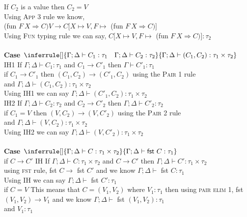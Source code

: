 \documentclass{article}
\begin{document}
If $C_2$ is a value then $C_2 = V$ \\
Using \textsc{App 3} rule we know,\\
(fun $F \ X \Rightarrow C) V \to C[X \mapsto V, F \mapsto$ (fun $F \ X \Rightarrow C)]$ \\
Using \textsc{Fun} typing rule we can say, $C[X \mapsto V, F \mapsto$ (fun $F \ X \Rightarrow C)] : \tau_2$
\\\\
\textbf{Case $\inferrule []
{ \Gamma ; \Delta \vdash C_1 : \tau_1 \quad \Gamma ; \Delta \vdash C_2 : \tau_2 }
{ \Gamma ; \Delta \vdash (C_1, C_2) : \tau_1 \times \tau_2  }$ } \\
IH1 If $\Gamma;\Delta \vdash C_1 : \tau_1$ and  $C_1 \to C'_1$ then $\Gamma \vdash C'_1 : \tau_1$ \\
if $C_1 \to C'_1$ then $(C_1,C_2) \to (C'_1, C_2)$ using the \textsc{Pair 1} rule\\
and $\Gamma;\Delta \vdash (C_1, C_2) : \tau_1 \times \tau_2$ \\
Using IH1 we can say $\Gamma;\Delta \vdash (C'_1, C_2) : \tau_1 \times \tau_2$ \\
IH2 If $\Gamma;\Delta \vdash C_2 : \tau_2$ and  $C_2 \to C'_2$ then $\Gamma;\Delta \vdash C'_2 : \tau_2$ \\
if $C_1 = V$ then $(V,C_2) \to (V, C'_2)$ using the \textsc{Pair 2} rule\\
and $\Gamma;\Delta \vdash (V, C_2) : \tau_1 \times \tau_2$ \\
Using IH2 we can say $\Gamma;\Delta \vdash (V, C'_2) : \tau_1 \times \tau_2$
\\\\
\textbf{Case $\inferrule []
{ \Gamma ; \Delta \vdash C : \tau_1 \times \tau_2 }
{ \Gamma ; \Delta \vdash \textsf{fst}\ C : \tau_1 }$ } \\
if $C \to C'$
IH If $\Gamma;\Delta \vdash C : \tau_1 \times \tau_2$ and  $C \to C'$ then $\Gamma;\Delta \vdash C' : \tau_1 \times \tau_2$ \\
using \textsc{fst} rule, fst $C \to$ fst $C'$ and we know $\Gamma;\Delta \vdash$ fst $C : \tau_1$ \\
Using IH we can say $\Gamma;\Delta \vdash$ fst $ C' : \tau_1$ \\
if $C = V$ This means that $C = (V_1, V_2)$ where $V_1 : \tau_1$
then using \textsc{pair elim 1}, fst $(V_1, V_2) \to V_1$ and we know $\Gamma;\Delta \vdash$ fst $(V_1, V_2) : \tau_1$ \\
and $V_1: \tau_1$\\\\
\end{document}
